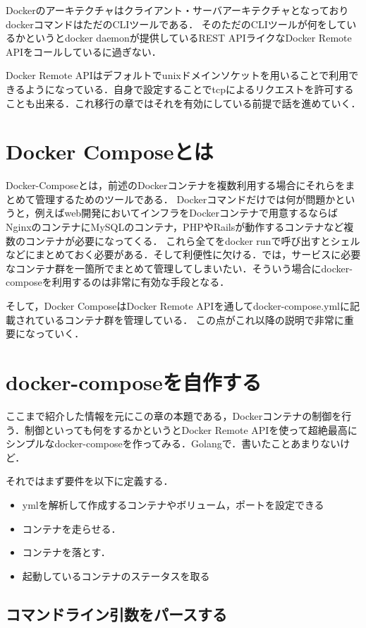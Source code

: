 Dockerのアーキテクチャはクライアント・サーバアーキテクチャとなっておりdockerコマンドはただのCLIツールである．
そのただのCLIツールが何をしているかというとdocker daemonが提供しているREST APIライクなDocker Remote APIをコールしているに過ぎない．


Docker Remote APIはデフォルトでunixドメインソケットを用いることで利用できるようになっている．自身で設定することでtcpによるリクエストを許可することも出来る．これ移行の章ではそれを有効にしている前提で話を進めていく．

\section{Docker Composeとは}

Docker-Composeとは，前述のDockerコンテナを複数利用する場合にそれらをまとめて管理するためのツールである．
Dockerコマンドだけでは何が問題かというと，例えばweb開発においてインフラをDockerコンテナで用意するならばNginxのコンテナにMySQLのコンテナ，PHPやRailsが動作するコンテナなど複数のコンテナが必要になってくる．
これら全てをdocker runで呼び出すとシェルなどにまとめておく必要がある．そして利便性に欠ける．では，サービスに必要なコンテナ群を一箇所でまとめて管理してしまいたい．そういう場合にdocker-composeを利用するのは非常に有効な手段となる．


そして，Docker ComposeはDocker Remote APIを通してdocker-compose.ymlに記載されているコンテナ群を管理している．
この点がこれ以降の説明で非常に重要になっていく．

\section{docker-composeを自作する}

ここまで紹介した情報を元にこの章の本題である，Dockerコンテナの制御を行う．制御といっても何をするかというとDocker Remote APIを使って超絶最高にシンプルなdocker-composeを作ってみる．Golangで．書いたことあまりないけど．


それではまず要件を以下に定義する．
\begin{itemize}
    \item ymlを解析して作成するコンテナやボリューム，ポートを設定できる
    \item コンテナを走らせる．
    \item コンテナを落とす．
    \item 起動しているコンテナのステータスを取る
\end{itemize}

\subsection{コマンドライン引数をパースする}

